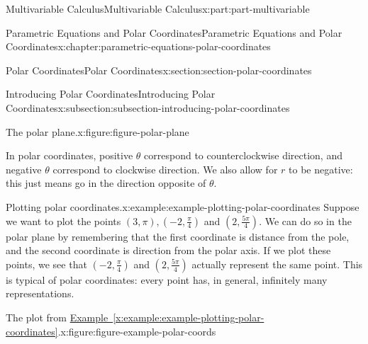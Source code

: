 \documentclass[twoside,10pt,]{tufte-book}
\newcommand{\xreffont}{\relax}
\numberwithin{equation}{part}
\begin{document}
\begin{partptx}{Multivariable Calculus}{}{Multivariable Calculus}{}{}{x:part:part-multivariable}
\begin{chapterptx}{Parametric Equations and Polar Coordinates}{}{Parametric Equations and Polar Coordinates}{}{}{x:chapter:parametric-equations-polar-coordinates}
\begin{sectionptx}{Polar Coordinates}{}{Polar Coordinates}{}{}{x:section:section-polar-coordinates}
\begin{subsectionptx}{Introducing Polar Coordinates}{}{Introducing Polar Coordinates}{}{}{x:subsection:subsection-introducing-polar-coordinates}
\begin{figureptx}{The polar plane.}{x:figure:figure-polar-plane}{}
\begin{image}{0}{1}{0}
{
}%
\end{image}%
\tcblower
\end{figureptx}%
In polar coordinates, positive \(\theta\) correspond to counterclockwise direction, and negative \(\theta\) correspond to clockwise direction. We also allow for \(r\) to be negative: this just means go in the direction opposite of \(\theta\).%
\begin{example}{Plotting polar coordinates.}{x:example:example-plotting-polar-coordinates}%
Suppose we want to plot the points \((3,\pi), (-2,\frac{\pi}{4})\) and \((2,\frac{5\pi}{4}).\) We can do so in the polar plane by remembering that the first coordinate is distance from the pole, and the second coordinate is direction from the polar axis. If we plot these points, we see that \((-2,\frac{\pi}{4})\) and \((2,\frac{5\pi}{4})\) actually represent the same point. This is typical of polar coordinates: every point has, in general, infinitely many representations.%
\end{example}
\begin{figureptx}{The plot from \hyperref[x:example:example-plotting-polar-coordinates]{Example~{\xreffont\ref{x:example:example-plotting-polar-coordinates}}}.}{x:figure:figure-example-polar-coords}{}%
\begin{image}{0}{1}{0}%
\end{image}
\end{figureptx}
\end{subsectionptx}
\end{sectionptx}
\end{chapterptx}
\end{partptx}
\end{document}
